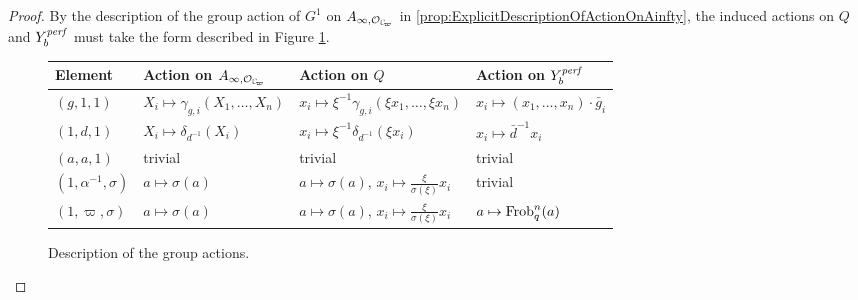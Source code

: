 \documentclass[../main.tex]{subfiles}
\begin{document}
\begin{proof}
By the description of the group action of $G^1$ on $A_{\infty, \cO_\Cp}$
in \cref{prop:ExplicitDescriptionOfActionOnAinfty}, the induced
actions on $Q$ and $Y_b^{\mathit{perf}}$ must take the form described in Figure
\ref{fig:TableOfGroupActionsOnModels}. 

\begin{figure}[H] 
\centering
\begin{center}
\begin{tabularx} {0.95\textwidth} { 
  |>{\centering\arraybackslash}X ||>{\centering\arraybackslash}X
  |>{\centering\arraybackslash}X |>{\centering\arraybackslash}X | }
 \hline
 Element & Action on $A_{\infty,\cO_\Cp}$ & Action on $Q$ & Action on
 $Y_b^{\mathit{perf}}$ \\ [0.5ex] 
 \hline\hline
 $(g,1,1)$ & $X_i \mapsto \gamma_{g,i}(X_1, \dots, X_n)$ & $x_i \mapsto
 \xi^{-1}\gamma_{g,i}(\xi x_1, \dots, \xi x_n)$ & $x_i \mapsto
 (x_1, \dots, x_n)\cdot\bar g_i$\\ 
 \hline
$(1,d,1)$ & $X_i \mapsto \delta_{d^{-1}}(X_i)$ & $x_i \mapsto \xi^{-1}
\delta_{d^{-1}}(\xi x_i)$ & $x_i \mapsto \bar d^{-1} x_i$ \\
 \hline
 $(a,a,1)$ & trivial & trivial & trivial \\
 \hline
 $(1, \alpha^{-1}, \sigma)$ & $a \mapsto \sigma(a)$& $a \mapsto \sigma(a)$, $x_i \mapsto  \tfrac{\xi}{\sigma(\xi)} x_i$ & trivial \\
 \hline
 $(1, \varpi, \sigma)$ & $a \mapsto \sigma(a)$& $a \mapsto \sigma(a)$, $x_i \mapsto
 \tfrac{\xi}{\sigma(\xi)} x_i$ & $a
 \mapsto \mathrm{Frob}_q^n(a)$ \\ [1ex] 
 \hline
\end{tabularx}
\end{center}
\caption{Description of the group actions.}
\label{fig:TableOfGroupActionsOnModels}
\end{figure}


\end{proof}
\end{document}
